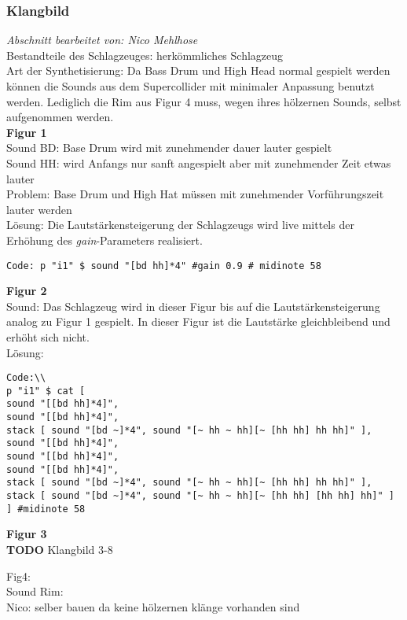 \documentclass[
10pt, %
a4paper, %
oneside, %
headinclude,footinclude, %
BCOR5mm, %
]{scrartcl}
\begin{document}
\subsubsection{Klangbild}
\textit{Abschnitt bearbeitet von: Nico Mehlhose}\\

\noindent Bestandteile des Schlagzeuges: herkömmliches Schlagzeug\\
Art der Synthetisierung: Da Bass Drum und High Head normal gespielt werden können die Sounds aus dem Supercollider 
mit minimaler Anpassung benutzt werden. Lediglich die Rim aus Figur 4 muss, wegen ihres hölzernen Sounds, selbst 
aufgenommen werden.\\
\noindent \textbf{Figur 1}\\
Sound BD: Base Drum wird mit zunehmender dauer lauter gespielt\\
Sound HH: wird Anfangs nur sanft angespielt aber mit zunehmender Zeit etwas lauter\\
Problem: Base Drum und High Hat müssen mit zunehmender Vorführungszeit lauter werden\\ 
Lösung: Die Lautstärkensteigerung der Schlagzeugs wird live mittels der Erhöhung des \textit{gain}-Parameters realisiert.\\
\begin{lstlisting}
Code: p "i1" $ sound "[bd hh]*4" #gain 0.9 # midinote 58
\end{lstlisting}
\noindent \textbf{Figur 2}\\
Sound: Das Schlagzeug wird in dieser Figur bis auf die Lautstärkensteigerung analog zu Figur 1 gespielt. In dieser Figur ist die Lautstärke gleichbleibend
und erhöht sich nicht.\\
Lösung:\\
\begin{lstlisting}
Code:\\
p "i1" $ cat [
sound "[[bd hh]*4]",
sound "[[bd hh]*4]",
stack [ sound "[bd ~]*4", sound "[~ hh ~ hh][~ [hh hh] hh hh]" ],
sound "[[bd hh]*4]",
sound "[[bd hh]*4]",
sound "[[bd hh]*4]",
stack [ sound "[bd ~]*4", sound "[~ hh ~ hh][~ [hh hh] hh hh]" ],
stack [ sound "[bd ~]*4", sound "[~ hh ~ hh][~ [hh hh] [hh hh] hh]" ]
] #midinote 58
\end{lstlisting}
\noindent \textbf{Figur 3}\\

{\color{red}\textbf{TODO}} Klangbild 3-8

Fig4:\\
Sound Rim: \\
Nico: selber bauen da keine hölzernen klänge vorhanden sind
\end{document}
